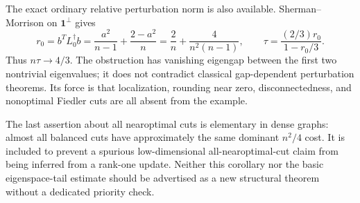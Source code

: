 \documentclass[11pt]{article}
\newcommand{\one}{\boldsymbol 1}
\begin{document}
The exact ordinary relative perturbation norm is also available.
Sherman--Morrison on $\one^\perp$ gives
\[
 r_0=b^TL_0^\dagger b
 =\frac{a^2}{n-1}+\frac{2-a^2}{n}
 =\frac2n+\frac4{n^2(n-1)},\qquad
 \tau=\frac{(2/3)r_0}{1-r_0/3}.
\]
Thus $n\tau\to4/3$. The obstruction has vanishing eigengap between
the first two nontrivial eigenvalues; it does not contradict classical
gap-dependent perturbation theorems. Its force is that localization,
rounding near zero, disconnectedness, and nonoptimal Fiedler cuts are
all absent from the example.

The last assertion about all nearoptimal cuts is elementary in dense
graphs: almost all balanced cuts have approximately the same dominant
$n^2/4$ cost. It is included to prevent a spurious low-dimensional
all-nearoptimal-cut claim from being inferred from a rank-one update.
Neither this corollary nor the basic eigenspace-tail estimate should be
advertised as a new structural theorem without a dedicated priority check.
\end{document}
